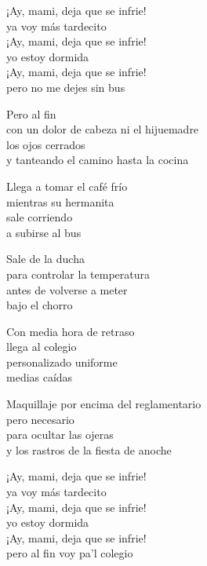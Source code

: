 \begin{lyrics}
¡Ay, mami, deja que se infrie!\\
ya voy más tardecito\\
¡Ay, mami, deja que se infrie!\\
yo estoy dormida\\
¡Ay, mami, deja que se infrie!\\
pero no me dejes sin bus

Pero al fin\\
con un dolor de cabeza ni el hijuemadre\\
los ojos cerrados\\
y tanteando el camino hasta la cocina

Llega a tomar el café frío\\
mientras su hermanita\\
sale corriendo\\
a subirse al bus

Sale de la ducha\\
para controlar la temperatura\\
antes de volverse a meter\\
bajo el chorro

Con media hora de retraso\\
llega al colegio\\
personalizado uniforme\\
medias caídas

Maquillaje por encima del reglamentario\\
pero necesario\\
para ocultar las ojeras\\
y los rastros de la fiesta de anoche

¡Ay, mami, deja que se infrie!\\
ya voy más tardecito\\
¡Ay, mami, deja que se infrie!\\
yo estoy dormida\\
¡Ay, mami, deja que se infrie!\\
pero al fin voy pa’l colegio
\end{lyrics}

